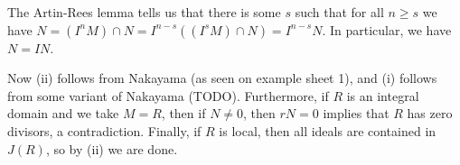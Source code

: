 The Artin-Rees lemma tells us that there is some $s$ such that for all $n\geq s$
we have $N = (I^nM)\cap N = I^{n-s}((I^sM)\cap N) = I^{n-s}N$. In particular, we
have $N = IN$.

Now (ii) follows from Nakayama (as seen on example sheet 1), and (i) follows
from some variant of Nakayama
(TODO). Furthermore, if $R$ is an integral domain and we take $M = R$, then
if $N\neq 0$, then $rN = 0$ implies that $R$ has zero divisors, a contradiction.
Finally, if $R$ is local, then all ideals are contained in $J(R)$, so by (ii)
we are done.
